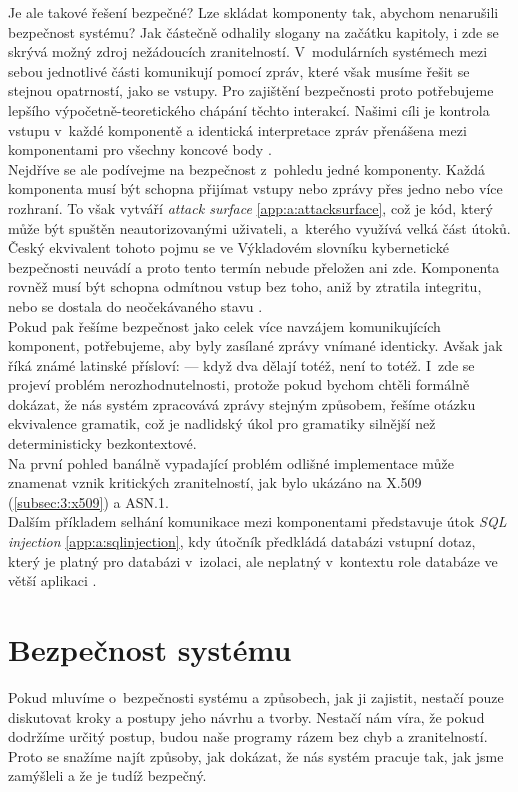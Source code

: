 Je ale takové řešení bezpečné? Lze skládat komponenty tak, abychom nenarušili bezpečnost systému? Jak částečně odhalily slogany na začátku kapitoly, 
i zde se skrývá možný zdroj nežádoucích zranitelností. V~modulárních systémech mezi sebou jednotlivé části komunikují pomocí zpráv, které však musíme 
řešit se stejnou opatrností, jako se vstupy. Pro zajištění bezpečnosti proto potřebujeme lepšího výpočetně-teoretického chápání těchto interakcí. 
Našimi cíli je kontrola vstupu v~každé komponentě a identická interpretace zpráv přenášena mezi komponentami pro všechny koncové 
body \cite[str. 489]{Sass2013}. \\

Nejdříve se ale podívejme na bezpečnost z~pohledu jedné komponenty.  Každá komponenta musí být schopna přijímat vstupy nebo zprávy přes jedno nebo více 
rozhraní. To však vytváří \textit{attack surface} \ref{app:a:attacksurface}, což je kód, který může být spuštěn neautorizovanými uživateli, a~kterého 
využívá velká část útoků. Český ekvivalent tohoto pojmu se ve Výkladovém slovníku kybernetické bezpečnosti neuvádí a proto tento termín nebude přeložen 
ani zde. Komponenta rovněž musí být schopna odmítnou vstup bez toho, aniž by ztratila integritu, nebo se dostala do neočekávaného 
stavu \cite[str. 490]{Sass2013}. \\

Pokud pak řešíme bezpečnost jako celek více navzájem komunikujících komponent, potřebujeme, aby byly zasílané zprávy vnímané identicky. Avšak jak říká 
známé latinské přísloví: \textit{} --- když dva dělají totéž, není to totéž. I~zde se projeví problém 
nerozhodnutelnosti, protože pokud bychom chtěli formálně dokázat, že nás systém zpracovává zprávy stejným způsobem, řešíme otázku ekvivalence gramatik, 
což je nadlidský úkol pro gramatiky silnější než deterministicky bezkontextové. \\ 

Na první pohled banálně vypadající problém odlišné implementace může znamenat vznik kritických zranitelností, jak bylo ukázáno na 
X.509 (\ref{subsec:3:x509}) a ASN.1. \\

Dalším příkladem selhání komunikace mezi komponentami představuje útok \textit{SQL injection} \ref{app:a:sqlinjection}, kdy útočník předkládá databázi 
vstupní dotaz, který je platný pro databázi v~izolaci, ale neplatný v~kontextu role databáze ve větší aplikaci \cite[str. 491]{Sass2013}.

\section{Bezpečnost systému} \label{sec:4:systemsecurity} 
Pokud mluvíme o~bezpečnosti systému a způsobech, jak ji zajistit, nestačí pouze diskutovat kroky a postupy jeho návrhu a tvorby. Nestačí nám víra, že 
pokud dodržíme určitý postup, budou naše programy rázem bez chyb a zranitelností. Proto se snažíme najít způsoby, jak dokázat, že nás systém pracuje tak, 
jak jsme zamýšleli a že je tudíž bezpečný. \\

